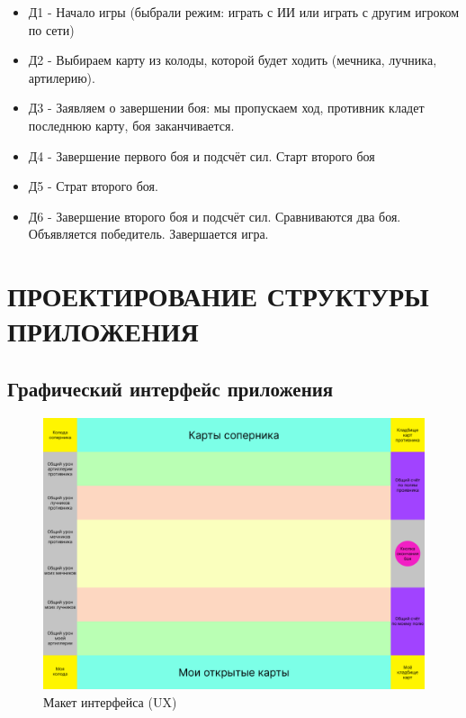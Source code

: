 \documentclass[12pt, a4paper, simple]{eskdtext}
\begin{document}
    \begin{itemize}
        \item Д1 - Начало игры (быбрали режим: играть с ИИ или играть с другим игроком по сети)
        \item Д2 - Выбираем карту из колоды, которой будет ходить (мечника, лучника, артилерию).
        \item Д3 - Заявляем о завершении боя: мы пропускаем ход, противник кладет последнюю карту, боя заканчивается.
        \item Д4 - Завершение первого боя и подсчёт сил. Старт второго боя
        \item Д5 - Страт второго боя.
        \item Д6 - Завершение второго боя и подсчёт сил. Сравниваются два боя. Объявляется победитель. Завершается игра.
    \end{itemize}

    \newpage
    \section{ПРОЕКТИРОВАНИЕ СТРУКТУРЫ ПРИЛОЖЕНИЯ}

    
    \subsection{Графический интерфейс приложения}
    
    \begin{figure}[!h]
        \centering
        \includegraphics[width=12cm]
            {../sources/game_ux/build/game_ux.png}
        \caption{Макет интерфейса (UX)}
    \end{figure}
\end{document}
